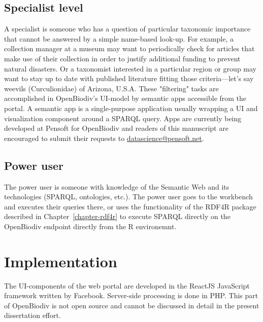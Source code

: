 \subsection{Specialist level}

A specialist is someone who has a question of particular taxonomic importance that cannot be answered by a simple name-based look-up. For example, a collection manager at a museum may want to periodically check for articles that make use of their collection in order to justify additional funding to prevent natural disasters. Or a taxonomist interested in a particular region or group may want to stay up to date with published literature fitting those criteria---let's say weevils (Curculionidae) of Arizona, U.S.A. These "filtering" tasks are accomplished in OpenBiodiv's UI-model by semantic apps accessible from the portal. A semantic app is a single-purpose application usually wrapping a UI and visualization component around a SPARQL query. Apps are currently being developed at Pensoft for OpenBiodiv and readers of this manuscript are encouraged to submit their requests to \url{datascience@pensoft.net}.

\subsection{Power user}

The power user is someone with knowledge of the Semantic Web and its technologies (SPARQL, ontologies, etc.). The power user goes to the workbench and executes their queries there, or uses the functionality of the RDF4R package described in Chapter~\ref{chapter-rdf4r} to execute SPARQL directly on the OpenBiodiv endpoint directly from the R environemnt.

\section{Implementation}

The UI-components of the web portal are developed in the ReactJS JavaScript framework written by Facebook. Server-side processing is done in PHP. This part of OpenBiodiv is not open source and cannot be discussed in detail in the present dissertation effort.
